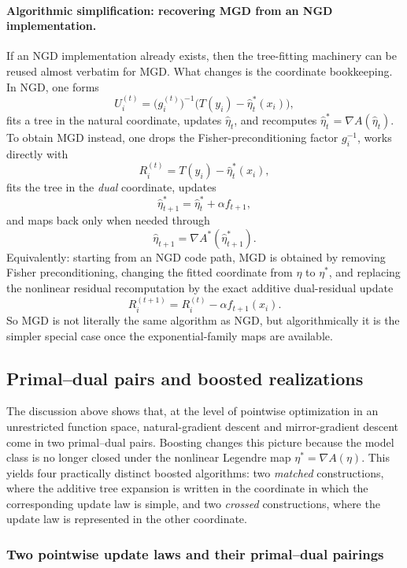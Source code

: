 \documentclass[11pt]{article}
\begin{document}
\paragraph{Algorithmic simplification: recovering MGD from an NGD implementation.}
If an NGD implementation already exists, then the tree-fitting machinery can be reused almost verbatim for MGD. What changes is the coordinate bookkeeping. In NGD, one forms
\[
U_i^{(t)}=\bigl(g_i^{(t)}\bigr)^{-1}\bigl(T(y_i)-\hat\eta_t^\ast(x_i)\bigr),
\]
fits a tree in the natural coordinate, updates \(\hat\eta_t\), and recomputes \(\hat\eta_t^\ast=\nabla A(\hat\eta_t)\). To obtain MGD instead, one drops the Fisher-preconditioning factor \(g_i^{-1}\), works directly with
\[
R_i^{(t)}=T(y_i)-\hat\eta_t^\ast(x_i),
\]
fits the tree in the \emph{dual} coordinate, updates
\[
\hat\eta_{t+1}^\ast=\hat\eta_t^\ast+\alpha f_{t+1},
\]
and maps back only when needed through
\[
\hat\eta_{t+1}=\nabla A^\ast(\hat\eta_{t+1}^\ast).
\]
Equivalently: starting from an NGD code path, MGD is obtained by removing Fisher preconditioning, changing the fitted coordinate from \(\eta\) to \(\eta^\ast\), and replacing the nonlinear residual recomputation by the exact additive dual-residual update
\[
R_i^{(t+1)}=R_i^{(t)}-\alpha f_{t+1}(x_i).
\]
So MGD is not literally the same algorithm as NGD, but algorithmically it is the simpler special case once the exponential-family maps are available.

\subsection{Primal--dual pairs and boosted realizations}

The discussion above shows that, at the level of pointwise optimization in an unrestricted function space, natural-gradient descent and mirror-gradient descent come in two primal--dual pairs. Boosting changes this picture because the model class is no longer closed under the nonlinear Legendre map \(\eta^\ast=\nabla A(\eta)\). This yields four practically distinct boosted algorithms: two \emph{matched} constructions, where the additive tree expansion is written in the coordinate in which the corresponding update law is simple, and two \emph{crossed} constructions, where the update law is represented in the other coordinate.

\subsubsection{Two pointwise update laws and their primal--dual pairings}
\end{document}
